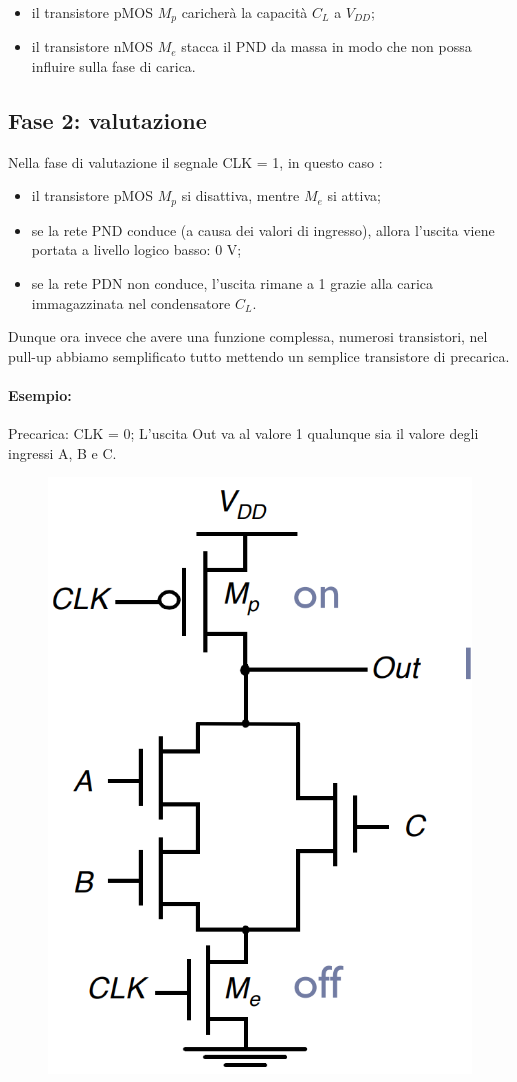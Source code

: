 \begin{itemize}
    \item il transistore pMOS $M_p$ caricherà la capacità $C_L$ a $V_{DD}$;
    \item il transistore nMOS $M_e$ stacca il PND da massa in modo che non possa influire sulla fase di carica.
\end{itemize}

\newpage
\subsection{Fase 2: valutazione}

Nella fase di valutazione il segnale CLK = 1, in questo caso :

\begin{itemize}
    \item il transistore pMOS $M_p$ si disattiva, mentre $M_e$ si attiva;
    \item se la rete PND conduce (a causa dei valori di ingresso), allora l'uscita viene portata a livello logico basso: 0 V;
    \item se	la	rete	PDN	non	conduce,	l'uscita rimane a	1	grazie	alla carica immagazzinata nel condensatore $C_L$.
\end{itemize}

Dunque ora invece che avere una funzione complessa, numerosi transistori, nel pull-up abbiamo semplificato tutto mettendo un semplice transistore di precarica.


\paragraph{Esempio:}
Precarica: CLK	=	0; L'uscita Out va al	valore 1	qualunque sia il valore degli ingressi A,	B	e	C.

\begin{figure}[htbp]
    \centering
    \includegraphics[width=0.26\linewidth]{img/esempio_precarica.png}
    
    
\end{figure}

